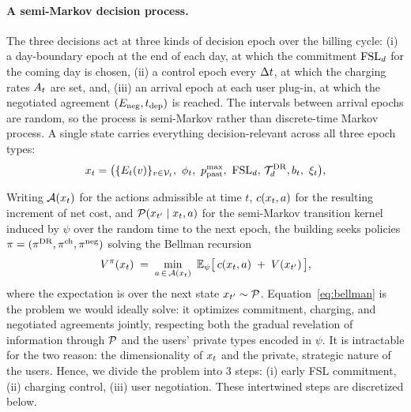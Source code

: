\paragraph{A semi-Markov decision process.} The three decisions act at three kinds of decision epoch over the billing cycle: (i) a {day-boundary} epoch at the end of each day, at which the commitment $\mathrm{FSL}_{d}$ for the coming day is chosen, (ii) a control epoch every $\Delta t$, at which the charging rates $A_{t}$ are set, and, (iii) an arrival epoch at each user plug-in, at which the negotiated agreement $(E_{\mathrm{neg}},t_{\mathrm{dep}})$ is reached. The intervals between arrival epochs are random, so the process is semi-Markov rather than discrete-time Markov process. A single state carries everything decision-relevant across all three epoch types:
\begin{equation}\label{eq:state}
x_t = \bigl(\{E_{t}(v)\}_{v\in\mathcal{V}_t},\ \phi_t,\
p^{\max}_{\mathrm{past}},\ \mathrm{FSL}_d,\, \mathcal{T}^{\mathrm{DR}}_{d},
b_{t},\ \xi_t\bigr),
\end{equation}

Writing $\mathcal{A}(x_t)$ for the actions admissible at time $t$, $c(x_t,a)$ for the resulting increment of net cost, and $\mathcal{P}(x_{t'}\mid x_t,a)$ for the semi-Markov transition kernel induced by $\psi$ over the random time to the next epoch, the building seeks policies $\pi=(\pi^{\mathrm{DR}},\pi^{\mathrm{ch}},\pi^{\mathrm{neg}})$ solving the Bellman recursion
\begin{equation}\label{eq:bellman}
V^\pi(x_t) \;=\; \min_{a\,\in\,\mathcal{A}(x_t)}\
\mathbb{E}_{\psi}\bigl[\, c(x_t,a) \;+\; V(x_{t'}) \,\bigr],
\end{equation}
where the expectation is over the next state $x_{t'}\sim\mathcal{P}$. 
Equation~\eqref{eq:bellman} is the problem we would ideally solve: it optimizes commitment, charging, and negotiated agreements jointly, respecting both the gradual revelation of information through $\mathcal{P}$ and the users' private types encoded in $\psi$. It is intractable for the two reason: the dimensionality of $x_t$ and the private, strategic nature of the users. Hence, we divide the problem into 3 steps: (i) early FSL commitment, (ii) charging control, (iii) user negotiation. These intertwined steps are discretized below.







